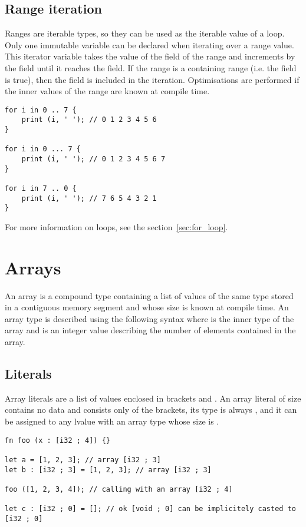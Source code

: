 \subsection {Range iteration}

 Ranges are iterable types, so they can be used as the iterable value of a
  loop. Only one immutable variable can be declared when iterating
 over a range value. This iterator variable takes the value of the 
 field of the range and increments by the  field until it reaches
 the  field. If the range is a containing range (i.e. the
  field is true), then the  field is included in
 the iteration. Optimisations are performed if the inner values of the range are
 known at compile time.

\begin{lstlisting}[style=coloredverbatim]
for i in 0 .. 7 {
    print (i, ' '); // 0 1 2 3 4 5 6
}

for i in 0 ... 7 {
    print (i, ' '); // 0 1 2 3 4 5 6 7
}

for i in 7 .. 0 {
    print (i, ' '); // 7 6 5 4 3 2 1
}
\end{lstlisting}

 For more information on  loops, see the section~\ref{sec:for_loop}.

\section{Arrays}

 An array is a compound type containing a list of values of the same type stored
 in a contiguous memory segment and whose size is known at compile time. An
 array type is described using the following syntax \token{[T ; N]} where
  is the inner type of the array and  is an integer value
 describing the number of elements contained in the array.

\subsection {Literals}

Array literals are a list of values enclosed in brackets \token{[} and
  \token{]}. An array literal of size  contains no data and consists
only of the brackets, its type is always \token{[void ; 0]}, and it can be
assigned to any lvalue with an array type whose size is .

\begin{lstlisting}[style=coloredverbatim]
fn foo (x : [i32 ; 4]) {}

let a = [1, 2, 3]; // array [i32 ; 3]
let b : [i32 ; 3] = [1, 2, 3]; // array [i32 ; 3]

foo ([1, 2, 3, 4]); // calling with an array [i32 ; 4]

let c : [i32 ; 0] = []; // ok [void ; 0] can be implicitely casted to [i32 ; 0]
\end{lstlisting}


